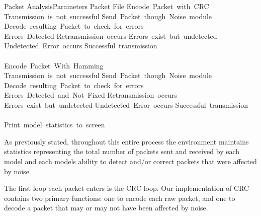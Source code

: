\documentclass{sigcomm-alternate}
\begin{document}
\begin{pseudocode}{Packet Analysis}{Parameters}
\FOREACH Packet \in File 
	\DO
	\BEGIN
		Encode\ Packet\ with\ CRC\\
		\WHILE Transmission\ is\ not\ successful
			\DO
			\BEGIN
				Send\ Packet\ though\ Noise\ module\\
				Decode\ resulting\ Packet\ to\ check\ for\ errors\\
				\IF Errors\ Detected
					\THEN
					\BEGIN
						Retransmission\ occurs
					\END
				\ELSEIF Errors\ exist\ but\ undetected
					\THEN
					\BEGIN
						Undetected\ Error\ occurs
					\END
				\ELSE
					Successful\ transmission
			\END\\\\
		Encode\ Packet\ With\ Hamming\\
		\WHILE Transmission\ is\ not\ successful
			\DO
			\BEGIN
				Send\ Packet\ though\ Noise\ module\\
				Decode\ resulting\ Packet\ to\ check\ for\ errors\\
				\IF Errors\ Detected\ and\ Not\ Fixed
					\THEN
					\BEGIN
						Retransmission\ occurs
					\END
				\ELSEIF Errors\ exist\ but\ undetected
					\THEN
					\BEGIN
						Undetected\ Error\ occurs
					\END
				\ELSE
					Successful\ transmission
			\END
	\END\\\\
	
Print\ model\ statistics\ to\ screen
\end{pseudocode}

As previously stated, throughout this entire process the environment maintains statistics representing the total number of packets sent and received by each model and each models ability to detect and/or correct packets that were affected by noise.

The first loop each packet enters is the CRC loop. Our implementation of CRC contains two primary functions: one to encode each raw packet, and one to decode a packet that may or may not have been affected by noise.
\end{document}
